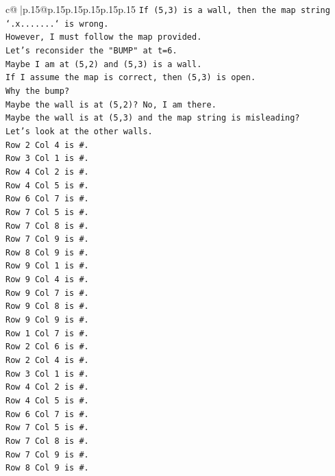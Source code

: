 \documentclass{article}
\begin{document}
{\begin{supertabular}{c@{$\;$}|p{.15\linewidth}@{}p{.15\linewidth}p{.15\linewidth}p{.15\linewidth}p{.15\linewidth}p{.15\linewidth}}
{{{\texttt{If (5,3) is a wall, then the map string `.x.......` is wrong.} \\
\texttt{However, I must follow the map provided.} \\
\texttt{Let's reconsider the "BUMP" at t=6.} \\
\texttt{Maybe I am at (5,2) and (5,3) is a wall.} \\
\texttt{If I assume the map is correct, then (5,3) is open.} \\
\texttt{Why the bump?} \\
\texttt{Maybe the wall is at (5,2)? No, I am there.} \\
\texttt{Maybe the wall is at (5,3) and the map string is misleading?} \\
\texttt{Let's look at the other walls.} \\
\texttt{Row 2 Col 4 is \#.} \\
\texttt{Row 3 Col 1 is \#.} \\
\texttt{Row 4 Col 2 is \#.} \\
\texttt{Row 4 Col 5 is \#.} \\
\texttt{Row 6 Col 7 is \#.} \\
\texttt{Row 7 Col 5 is \#.} \\
\texttt{Row 7 Col 8 is \#.} \\
\texttt{Row 7 Col 9 is \#.} \\
\texttt{Row 8 Col 9 is \#.} \\
\texttt{Row 9 Col 1 is \#.} \\
\texttt{Row 9 Col 4 is \#.} \\
\texttt{Row 9 Col 7 is \#.} \\
\texttt{Row 9 Col 8 is \#.} \\
\texttt{Row 9 Col 9 is \#.} \\
\texttt{Row 1 Col 7 is \#.} \\
\texttt{Row 2 Col 6 is \#.} \\
\texttt{Row 2 Col 4 is \#.} \\
\texttt{Row 3 Col 1 is \#.} \\
\texttt{Row 4 Col 2 is \#.} \\
\texttt{Row 4 Col 5 is \#.} \\
\texttt{Row 6 Col 7 is \#.} \\
\texttt{Row 7 Col 5 is \#.} \\
\texttt{Row 7 Col 8 is \#.} \\
\texttt{Row 7 Col 9 is \#.} \\
\texttt{Row 8 Col 9 is \#.} \\
}}}
\end{supertabular}}
\end{document}
